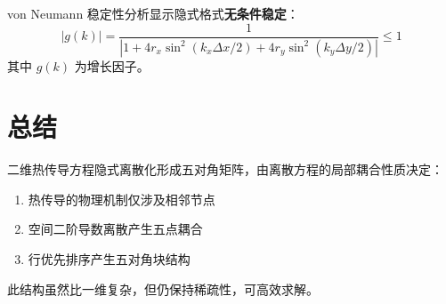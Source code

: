 \documentclass{ctexart}
\begin{document}
von Neumann 稳定性分析显示隐式格式\textbf{无条件稳定}：
\begin{equation}
|g(k)| = \frac{1}{|1 + 4r_x \sin^2(k_x \Delta x / 2) + 4r_y \sin^2(k_y \Delta y / 2)|} \leq 1
\end{equation}
其中 $g(k)$ 为增长因子。

\section{总结}
二维热传导方程隐式离散化形成五对角矩阵，由离散方程的局部耦合性质决定：
\begin{enumerate}
\item 热传导的物理机制仅涉及相邻节点
\item 空间二阶导数离散产生五点耦合
\item 行优先排序产生五对角块结构
\end{enumerate}
此结构虽然比一维复杂，但仍保持稀疏性，可高效求解。
\end{document}
